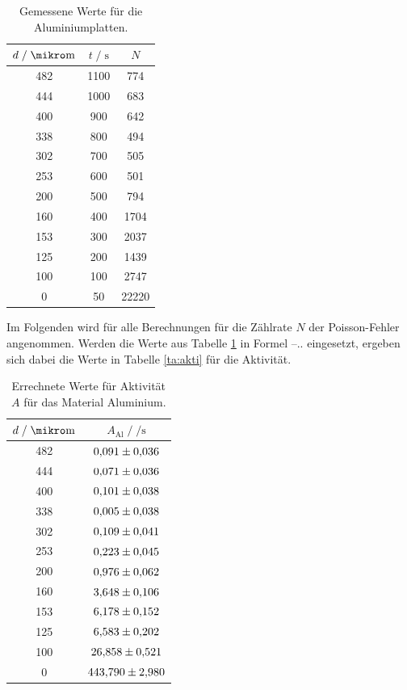 \begin{table}
    \centering
    \caption{Gemessene Werte für die Aluminiumplatten.}
    \label{tab:mess2}
    \begin{tabular}{c c c}
    \toprule
    $ d \;/\; \si{\mikro\meter} $ & $t \;/\; \si{\second}$ & $N$\\
    \midrule 
        482 & 1100 &   774\\
        444 & 1000 &   683\\
        400 &  900 &   642\\
        338 &  800 &   494\\
        302 &  700 &   505\\
        253 &  600 &   501\\
        200 &  500 &   794\\
        160 &  400 &  1704\\
        153 &  300 &  2037\\
        125 &  200 &  1439\\  
        100 &  100 &  2747\\ 
          0 &   50 & 22220\\       
    \bottomrule
    \end{tabular}
\end{table}

Im Folgenden wird für alle Berechnungen für die Zählrate $N$ der Poisson-Fehler angenommen.  
Werden die Werte aus Tabelle \ref{tab:mess2} in Formel --.. eingesetzt, ergeben sich dabei die 
Werte in Tabelle \ref{ta:akti} für die Aktivität. 

\begin{table}
    \centering
    \caption{Errechnete Werte für Aktivität $A$ für das Material Aluminium.}
    \label{tab:akti}
    \begin{tabular}{c c}
    \toprule
    $ d \;/\; \si{\mikro\meter} $ & $A_\text{Al} \;/\; \si{\per\second}$\\
    \midrule 
        482 & $\num{0.091+-0.036}$\\
        444 & $\num{0.071+-0.036}$\\
        400 & $\num{0.101+-0.038}$\\
        338 & $\num{0.005+-0.038}$\\
        302 & $\num{0.109+-0.041}$\\
        253 & $\num{0.223+-0.045}$\\
        200 & $\num{0.976+-0.062}$\\
        160 & $\num{3.648+-0.106}$\\
        153 & $\num{6.178+-0.152}$\\
        125 & $\num{6.583+-0.202}$\\  
        100 & $\num{26.858+-0.521}$\\ 
          0 & $\num{443.79+-2.980}$\\       
    \bottomrule
    \end{tabular}
\end{table}


